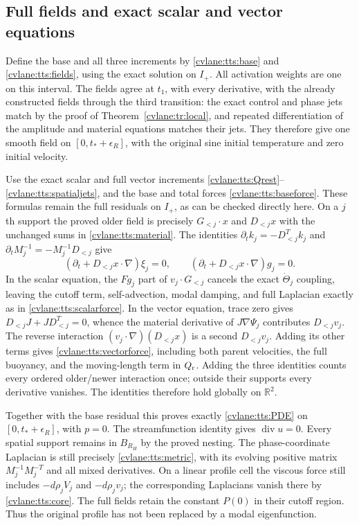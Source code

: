 \subsection{Full fields and exact scalar and vector equations}

Define the base and all three increments by
\eqref{cvlane:tts:base} and \eqref{cvlane:tts:fields}, using the exact
solution on $I_+$. All activation weights are one on this interval.
The fields agree at $t_1$, with every derivative, with the already
constructed fields through the third transition: the exact control
and phase jets match by the proof of Theorem~\ref{cvlane:tr:local},
and repeated differentiation of the amplitude and material equations
matches their jets. They therefore give one smooth field on
$[0,t_*+\epsilon_R]$, with the original sine initial temperature
and zero initial velocity.

Use the exact scalar and full vector increments
\eqref{cvlane:tts:Qrest}--\eqref{cvlane:tts:spatialjets}, and the base
and total forces \eqref{cvlane:tts:baseforce}. These formulas remain
the full residuals on $I_+$, as can be checked directly here.
On a $j$th support the proved older field is precisely
$G_{<j}\cdot x$ and $D_{<j}x$ with the unchanged sums in
\eqref{cvlane:tts:material}. The identities
$\partial_t k_j=-D_{<j}^Tk_j$ and
$\partial_t M_j^{-1}=-M_j^{-1}D_{<j}$ give
\[
 (\partial_t+D_{<j}x\cdot\nabla)\xi_j=0,
 \qquad
 (\partial_t+D_{<j}x\cdot\nabla)g_j=0.
\]
In the scalar equation, the $F g_j$ part of
$v_j\cdot G_{<j}$ cancels the exact $\dot\Theta_j$
coupling, leaving the cutoff term, self-advection, modal damping,
and full Laplacian exactly as in \eqref{cvlane:tts:scalarforce}.
In the vector equation, trace zero gives
$D_{<j}J+JD_{<j}^T=0$, whence the material derivative of
$J\nabla\Psi_j$ contributes $D_{<j}v_j$.
The reverse interaction $(v_j\cdot\nabla)(D_{<j}x)$
is a second $D_{<j}v_j$. Adding its other terms gives
\eqref{cvlane:tts:vectorforce}, including both parent velocities,
the full buoyancy, and the moving-length term in $Q_{\rm r}$.
Adding the three identities counts every ordered older/newer
interaction once; outside their supports every derivative vanishes.
The identities therefore hold globally on $\mathbb R^2$.

Together with the base residual this proves exactly
\eqref{cvlane:tts:PDE} on $[0,t_*+\epsilon_R]$, with $p=0$.
The streamfunction identity gives $\operatorname{div}u=0$.
Every spatial support remains in $B_{R_H}$ by the proved nesting.
The phase-coordinate Laplacian is still precisely
\eqref{cvlane:tts:metric}, with its evolving positive matrix
$M_j^{-1}M_j^{-T}$ and all mixed derivatives. On a linear
profile cell the viscous force still includes
$-d\rho_jV_j$ and $-d\rho_jv_j$; the corresponding
Laplacians vanish there by \eqref{cvlane:tts:core}. The full fields
retain the constant $P(0)$ in their cutoff region. Thus the
original profile has not been replaced by a modal eigenfunction.

